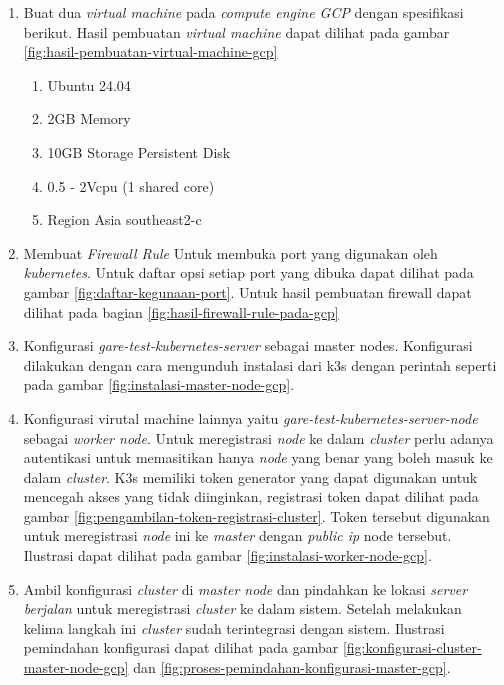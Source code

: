 \begin{enumerate}
  \item Buat dua \textit{virtual machine} pada \textit{compute engine GCP} dengan spesifikasi berikut. Hasil pembuatan \textit{virtual machine} dapat dilihat pada gambar \ref{fig:hasil-pembuatan-virtual-machine-gcp}
        \begin{enumerate}
          \item Ubuntu 24.04
          \item 2GB Memory
          \item 10GB Storage Persistent Disk
          \item 0.5 - 2Vcpu (1 shared core)
          \item Region Asia southeast2-c
        \end{enumerate}
  \item Membuat \textit{Firewall Rule} Untuk membuka port yang digunakan oleh \textit{kubernetes}. Untuk daftar opsi setiap port yang dibuka dapat dilihat pada gambar \ref{fig:daftar-kegunaan-port}. Untuk hasil pembuatan firewall dapat dilihat pada bagian \ref{fig:hasil-firewall-rule-pada-gcp}
  \item Konfigurasi \textit{gare-test-kubernetes-server} sebagai master nodes. Konfigurasi dilakukan dengan cara mengunduh instalasi dari k3s dengan perintah seperti pada gambar \ref{fig:instalasi-master-node-gcp}.
  \item Konfigurasi virutal machine lainnya yaitu \textit{gare-test-kubernetes-server-node} sebagai \textit{worker node}. Untuk meregistrasi \textit{node} ke dalam \textit{cluster} perlu adanya autentikasi untuk memasitikan hanya \textit{node} yang benar yang boleh masuk ke dalam \textit{cluster}. K3s memiliki token generator yang dapat digunakan untuk mencegah akses yang tidak diinginkan, registrasi token dapat dilihat pada gambar \ref{fig:pengambilan-token-registrasi-cluster}. Token tersebut digunakan untuk meregistrasi \textit{node} ini ke \textit{master} dengan \textit{public ip} node tersebut. Ilustrasi dapat dilihat pada gambar \ref{fig:instalasi-worker-node-gcp}.
  \item Ambil konfigurasi \textit{cluster} di \textit{master node} dan pindahkan ke lokasi \textit{server berjalan} untuk meregistrasi \textit{cluster} ke dalam sistem. Setelah melakukan kelima langkah ini \textit{cluster} sudah terintegrasi dengan sistem. Ilustrasi pemindahan konfigurasi dapat dilihat pada gambar \ref{fig:konfigurasi-cluster-master-node-gcp} dan \ref{fig:proses-pemindahan-konfigurasi-master-gcp}.
\end{enumerate}

